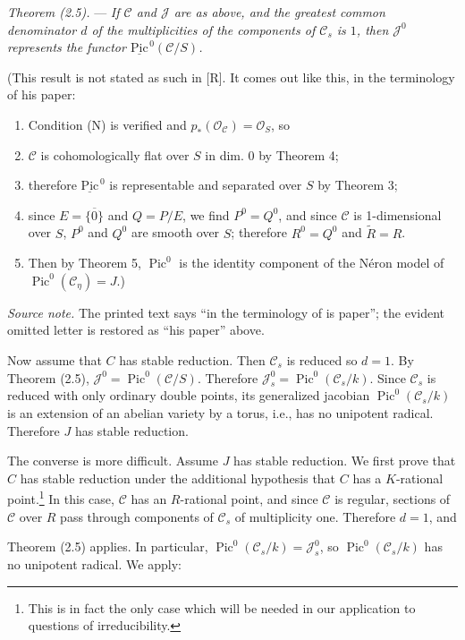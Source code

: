 \documentclass[10pt]{article}
\newcommand{\Pic}{\operatorname{Pic}}
\newcommand{\cO}{\mathcal O}
\begin{document}
\medskip
\noindent\emph{Theorem (2.5).} --- \emph{If $\mathscr C$ and $\mathscr J$ are as above, and the greatest common denominator $d$ of the multiplicities of the components of $\mathscr C_s$ is $1$, then $\mathscr J^0$ represents the functor $\underline{\mathrm{Pic}}^{\,0}(\mathscr C/S)$.}

(This result is not stated as such in [R]. It comes out like this, in the terminology of his paper:
\begin{enumerate}[label=\emph{\alph*)}]
\item Condition (N) is verified and $p_*(\cO_{\mathscr C})=\cO_S$, so
\item $\mathscr C$ is cohomologically flat over $S$ in dim. 0 by Theorem 4;
\item therefore $\underline{\mathrm{Pic}}^{\,0}$ is representable and separated over $S$ by Theorem 3;
\item since $E=\overline{\{0\}}$ and $Q=P/E$, we find $P^0=Q^0$, and since $\mathscr C$ is 1-dimensional over $S$, $P^0$ and $Q^0$ are smooth over $S$; therefore $R^0=Q^0$ and $\widetilde R=R$.
\item Then by Theorem 5, $\Pic^0$ is the identity component of the N\'eron model of $\Pic^0(\mathscr C_\eta)=J$.)
\end{enumerate}

\noindent\emph{Source note.} The printed text says ``in the terminology of is paper''; the evident omitted letter is restored as ``his paper'' above.

Now assume that $C$ has stable reduction. Then $\mathscr C_s$ is reduced so $d=1$. By Theorem (2.5), $\mathscr J^0=\Pic^0(\mathscr C/S)$. Therefore $\mathscr J_s^0=\Pic^0(\mathscr C_s/k)$. Since $\mathscr C_s$ is reduced with only ordinary double points, its generalized jacobian $\Pic^0(\mathscr C_s/k)$ is an extension of an abelian variety by a torus, i.e., has no unipotent radical. Therefore $J$ has stable reduction.

The converse is more difficult. Assume $J$ has stable reduction. We first prove that $C$ has stable reduction under the additional hypothesis that $C$ has a $K$-rational point.\footnote{This is in fact the only case which will be needed in our application to questions of irreducibility.} In this case, $\mathscr C$ has an $R$-rational point, and since $\mathscr C$ is regular, sections of $\mathscr C$ over $R$ pass through components of $\mathscr C_s$ of multiplicity one. Therefore $d=1$, and

Theorem (2.5) applies. In particular, $\Pic^0(\mathscr C_s/k)=\mathscr J_s^0$, so $\Pic^0(\mathscr C_s/k)$ has no unipotent radical. We apply:
\end{document}
